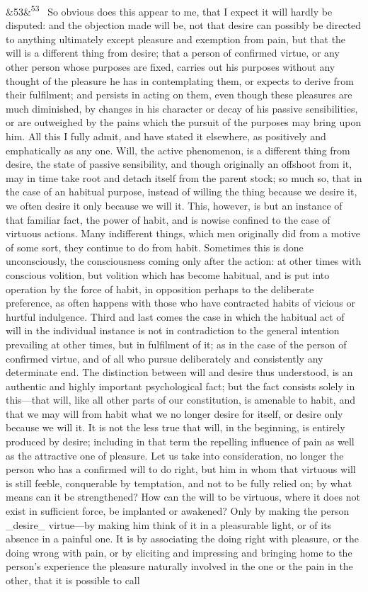 \documentclass[12pt]{article}
\newcommand{\para}[1][]{\par\noindent\ifx&#1&\else\textsuperscript{\footnotesize #1}~\fi}
\begin{document}
\para[53] So obvious does this appear to me, that I expect it will hardly be disputed: and the objection made will be, not that desire can possibly be directed to anything ultimately except pleasure and exemption from pain, but that the will is a different thing from desire; that a person of confirmed virtue, or any other person whose purposes are fixed, carries out his purposes without any thought of the pleasure he has in contemplating them, or expects to derive from their fulfilment; and persists in acting on them, even though these pleasures are much diminished, by changes in his character or decay of his passive sensibilities, or are outweighed by the pains which the pursuit of the purposes may bring upon him. All this I fully admit, and have stated it elsewhere, as positively and emphatically as any one. Will, the active phenomenon, is a different thing from desire, the state of passive sensibility, and though originally an offshoot from it, may in time take root and detach itself from the parent stock; so much so, that in the case of an habitual purpose, instead of willing the thing because we desire it, we often desire it only because we will it. This, however, is but an instance of that familiar fact, the power of habit, and is nowise confined to the case of virtuous actions. Many indifferent things, which men originally did from a motive of some sort, they continue to do from habit. Sometimes this is done unconsciously, the consciousness coming only after the action: at other times with conscious volition, but volition which has become habitual, and is put into operation by the force of habit, in opposition perhaps to the deliberate preference, as often happens with those who have contracted habits of vicious or hurtful indulgence. Third and last comes the case in which the habitual act of will in the individual instance is not in contradiction to the general intention prevailing at other times, but in fulfilment of it; as in the case of the person of confirmed virtue, and of all who pursue deliberately and consistently any determinate end. The distinction between will and desire thus understood, is an authentic and highly important psychological fact; but the fact consists solely in this---that will, like all other parts of our constitution, is amenable to habit, and that we may will from habit what we no longer desire for itself, or desire only because we will it. It is not the less true that will, in the beginning, is entirely produced by desire; including in that term the repelling influence of pain as well as the attractive one of pleasure. Let us take into consideration, no longer the person who has a confirmed will to do right, but him in whom that virtuous will is still feeble, conquerable by temptation, and not to be fully relied on; by what means can it be strengthened? How can the will to be virtuous, where it does not exist in sufficient force, be implanted or awakened? Only by making the person \_desire\_ virtue---by making him think of it in a pleasurable light, or of its absence in a painful one. It is by associating the doing right with pleasure, or the doing wrong with pain, or by eliciting and impressing and bringing home to the person's experience the pleasure naturally involved in the one or the pain in the other, that it is possible to call 
\end{document}
